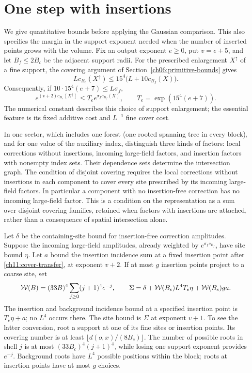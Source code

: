 \section{One step with insertions}
\label{ch11:marked-step}

We give quantitative bounds before applying the Gaussian comparison.
This also specifies the margin in the support exponent needed when the number of
inserted points grows with the volume. Fix an output exponent $e\ge0$,
put $v=e+5$, and let $B_f\le2B_c$ be the adjacent support radii.
For the prescribed enlargement $X^\uparrow$ of a fine support, the
covering argument of Section~\ref{ch06:primitive-bounds} gives
\[
 Lc_{B_c}(X^\uparrow)\le15^4\bigl(L+10c_{B_f}(X)\bigr).
\]
Consequently, if $10\cdot15^4(e+7)\le L\sigma_f$,
\begin{equation}
 e^{(v+2)c_{B_c}(X^\uparrow)}
 \le T_e e^{\sigma_f c_{B_f}(X)},\qquad
 T_e=\exp(15^4(e+7)).
 \label{ch11:cover-transfer}
\end{equation}
The numerical constant describes this choice of support enlargement;
the essential feature is its fixed additive cost and $L^{-1}$ fine
cover cost.

In one sector, which includes one forest (one rooted spanning tree in every block), and for one value of the auxiliary index, distinguish three kinds of factors:
local corrections without insertions, incoming large-field factors, and insertion factors
with nonempty index sets. Their dependence sets determine
the intersection graph. The condition of disjoint covering requires the local corrections without insertions in each
component to cover every site prescribed by its incoming large-field factors. In particular a component
with no insertion-free correction has no incoming large-field factor.
This is a condition on the representation as a sum over disjoint covering families, retained when
factors with insertions are attached, rather than a consequence of spatial
intersection alone.

Let $\delta$ be the containing-site bound for insertion-free correction
amplitudes. Suppose the incoming large-field amplitudes, already
weighted by $e^{\sigma_f c_{B_f}}$, have site bound $\eta$.
Let $a$ bound the insertion incidence sum at a fixed insertion point after
\eqref{ch11:cover-transfer}, at exponent $v+2$.
If at most $g$ insertion points project to a coarse site, set
\[
 {\cal W}(B)=(33B)^4\sum_{j\ge0}(j+1)^4e^{-j},\qquad
 \Sigma=\delta+{\cal W}(B_c)L^4T_e\eta+{\cal W}(B_c)g a.
\]
The insertion and background incidence bound at a specified insertion point is
$T_e\eta+a$; no $L^4$ occurs there. The site bound is $\Sigma$ at
exponent $v+1$. To see the latter conversion, root a support at one of
its fine sites or insertion points. Its covering number is at least
$\lfloor d(o,x)/(8B_c)\rfloor$. The number of possible roots in shell
$j$ is at most $(33B_c)^4(j+1)^4$, while losing one support exponent
provides $e^{-j}$. Background roots have $L^4$ possible positions within the block;
roots at insertion points have at most $g$ choices.

